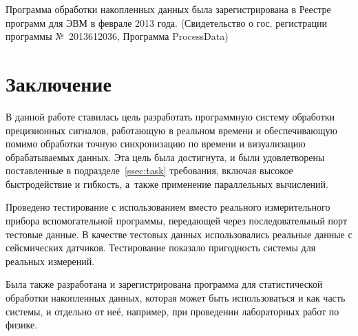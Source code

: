 \documentclass[a4paper, 14pt]{extarticle}
\newcommand\sectiontoc[1]{\section*{#1}\addcontentsline{toc}{section}{#1}}
\begin{document}

  Программа обработки накопленных данных была зарегистрирована в Реестре программ для ЭВМ в феврале 2013
  года. (Свидетельство о гос. регистрации программы №~2013612036, Программа ProcessData)

  \sectiontoc{Заключение}

  В данной работе ставилась цель разработать программную систему обработки прецизионных сигналов,
  работающую в реальном времени и обеспечивающую помимо обработки точную синхронизацию по времени и
  визуализацию обрабатываемых данных. Эта цель была достигнута, и были удовлетворены поставленные в
  подразделе~\ref{ssec:task} требования, включая высокое быстродействие и гибкость, а~также применение
  параллельных вычислений.

  Проведено тестирование с использованием вместо реального измерительного прибора вспомогательной
  программы, передающей через последовательный порт тестовые данные. В качестве тестовых данных
  использовались реальные данные с сейсмических датчиков. Тестирование показало пригодность системы
  для реальных измерений.

  Была также разработана и зарегистрирована программа для статистической обработки накопленных
  данных, которая может быть использоваться и как часть системы, и отдельно от неё, например, при
  проведении лабораторных работ по физике.
\end{document}
